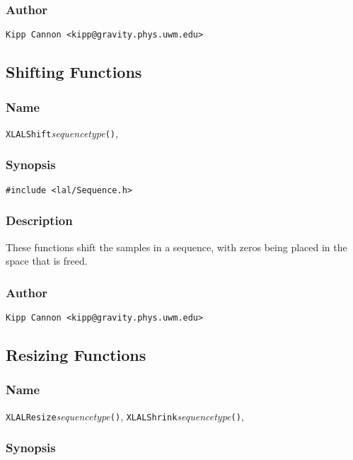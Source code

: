 \subsubsection{Author}

\verb|Kipp Cannon <kipp@gravity.phys.uwm.edu>|


\subsection{Shifting Functions}

\subsubsection{Name}

\texttt{XLALShift}\textit{sequencetype}\texttt{()},

\subsubsection{Synopsis}

\begin{verbatim}
#include <lal/Sequence.h>
\end{verbatim}


\subsubsection{Description}

These functions shift the samples in a sequence, with zeros being placed in
the space that is freed.

\subsubsection{Author}

\verb|Kipp Cannon <kipp@gravity.phys.uwm.edu>|


\subsection{Resizing Functions}

\subsubsection{Name}

\texttt{XLALResize}\textit{sequencetype}\texttt{()},
\texttt{XLALShrink}\textit{sequencetype}\texttt{()},

\subsubsection{Synopsis}


